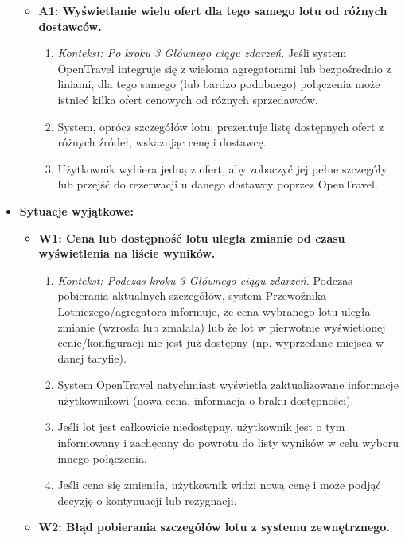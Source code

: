\documentclass[a4paper,12pt]{article}
\begin{document}
\begin{itemize}
\begin{itemize}
            \item \textbf{A1: Wyświetlanie wielu ofert dla tego samego lotu od różnych dostawców.}
                \begin{enumerate}
                    \item \textit{Kontekst: Po kroku 3 Głównego ciągu zdarzeń.} Jeśli system OpenTravel integruje się z wieloma agregatorami lub bezpośrednio z liniami, dla tego samego (lub bardzo podobnego) połączenia może istnieć kilka ofert cenowych od różnych sprzedawców.
                    \item System, oprócz szczegółów lotu, prezentuje listę dostępnych ofert z różnych źródeł, wskazując cenę i dostawcę.
                    \item Użytkownik wybiera jedną z ofert, aby zobaczyć jej pełne szczegóły lub przejść do rezerwacji u danego dostawcy poprzez OpenTravel.
                \end{enumerate}
        \end{itemize}
    \item \textbf{Sytuacje wyjątkowe:}
        \begin{itemize}
            \item \textbf{W1: Cena lub dostępność lotu uległa zmianie od czasu wyświetlenia na liście wyników.}
                \begin{enumerate}
                    \item \textit{Kontekst: Podczas kroku 3 Głównego ciągu zdarzeń.} Podczas pobierania aktualnych szczegółów, system Przewoźnika Lotniczego/agregatora informuje, że cena wybranego lotu uległa zmianie (wzrosła lub zmalała) lub że lot w pierwotnie wyświetlonej cenie/konfiguracji nie jest już dostępny (np. wyprzedane miejsca w danej taryfie).
                    \item System OpenTravel natychmiast wyświetla zaktualizowane informacje użytkownikowi (nowa cena, informacja o braku dostępności).
                    \item Jeśli lot jest całkowicie niedostępny, użytkownik jest o tym informowany i zachęcany do powrotu do listy wyników w celu wyboru innego połączenia.
                    \item Jeśli cena się zmieniła, użytkownik widzi nową cenę i może podjąć decyzję o kontynuacji lub rezygnacji.
                \end{enumerate}
            \item \textbf{W2: Błąd pobierania szczegółów lotu z systemu zewnętrznego.}
                \begin{enumerate}

\end{enumerate}
\end{itemize}
\end{itemize}
\end{document}

